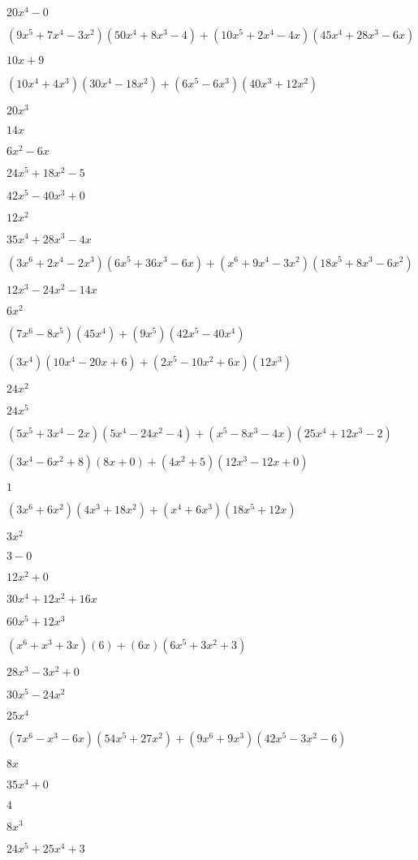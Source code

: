 \documentclass{article}
\begin{document}
\begin{multicols}{2}
$20x^{4}-0$\item $(9x^{5}+7x^{4}-3x^2)(50x^{4}+8x^{3}-4)+(10x^{5}+2x^{4}-4x)(45x^{4}+28x^{3}-6x)$\item $10x+9$\item $(10x^{4}+4x^{3})(30x^{4}-18x^{2})+(6x^{5}-6x^{3})(40x^{3}+12x^{2})$\item $20x^{3}$\item $14x$\item $6x^{2}-6x$\item $24x^{5}+18x^{2}-5$\item $42x^{5}-40x^{3}+0$\item $12x^{2}$\item $35x^{4}+28x^{3}-4x$\item $(3x^{6}+2x^{4}-2x^{3})(6x^{5}+36x^{3}-6x)+(x^{6}+9x^{4}-3x^2)(18x^{5}+8x^{3}-6x^{2})$\item $12x^{3}-24x^{2}-14x$\item $6x^{2}$\item $(7x^{6}-8x^{5})(45x^{4})+(9x^{5})(42x^{5}-40x^{4})$\item $(3x^{4})(10x^{4}-20x+6)+(2x^{5}-10x^2+6x)(12x^{3})$\item $24x^{2}$\item $24x^{5}$\item $(5x^{5}+3x^{4}-2x)(5x^{4}-24x^{2}-4)+(x^{5}-8x^{3}-4x)(25x^{4}+12x^{3}-2)$\item $(3x^{4}-6x^2+8)(8x+0)+(4x^2+5)(12x^{3}-12x+0)$\item $1$\item $(3x^{6}+6x^2)(4x^{3}+18x^{2})+(x^{4}+6x^{3})(18x^{5}+12x)$\item $3x^{2}$\item $3-0$\item $12x^{2}+0$\item $30x^{4}+12x^{2}+16x$\item $60x^{5}+12x^{3}$\item $(x^{6}+x^{3}+3x)(6)+(6x)(6x^{5}+3x^{2}+3)$\item $28x^{3}-3x^{2}+0$\item $30x^{5}-24x^{2}$\item $25x^{4}$\item $(7x^{6}-x^{3}-6x)(54x^{5}+27x^{2})+(9x^{6}+9x^{3})(42x^{5}-3x^{2}-6)$\item $8x$\item $35x^{4}+0$\item $4$\item $8x^{3}$\item $24x^{5}+25x^{4}+3$\item 
\end{multicols}
\end{document}
